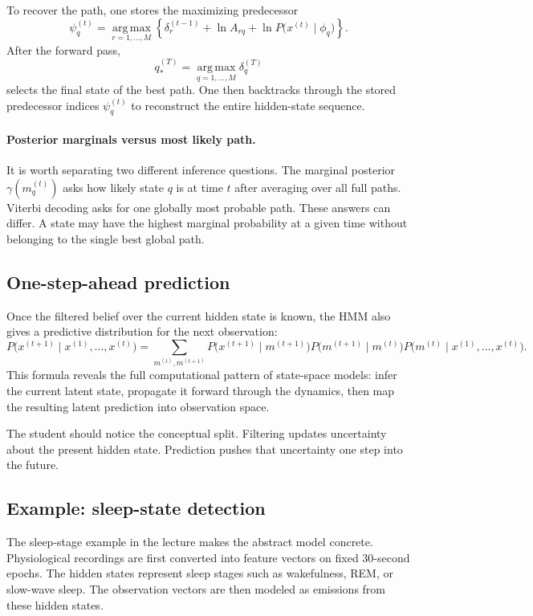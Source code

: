 To recover the path, one stores the maximizing predecessor
\[
  \psi_q^{(t)}
  =
  \operatorname*{arg\,max}_{r=1,\dots,M}
  \left\{
    \delta_r^{(t-1)} + \ln A_{rq} + \ln P\bigl(x^{(t)}\mid \phi_q\bigr)
  \right\}.
\]
After the forward pass,
\[
  q_*^{(T)}
  =
  \operatorname*{arg\,max}_{q=1,\dots,M}\delta_q^{(T)}
\]
selects the final state of the best path. One then backtracks through the stored predecessor indices $\psi_q^{(t)}$ to reconstruct the entire hidden-state sequence.

\paragraph{Posterior marginals versus most likely path.}
It is worth separating two different inference questions. The marginal posterior $\gamma(m_q^{(t)})$ asks how likely state $q$ is at time $t$ after averaging over all full paths. Viterbi decoding asks for one globally most probable path. These answers can differ. A state may have the highest marginal probability at a given time without belonging to the single best global path.

\subsection{One-step-ahead prediction}

Once the filtered belief over the current hidden state is known, the HMM also gives a predictive distribution for the next observation:
\[
  P\bigl(x^{(t+1)}\mid x^{(1)},\dots,x^{(t)}\bigr)
  =
  \sum_{m^{(t)},m^{(t+1)}}
  P\bigl(x^{(t+1)}\mid m^{(t+1)}\bigr)
  P\bigl(m^{(t+1)}\mid m^{(t)}\bigr)
  P\bigl(m^{(t)}\mid x^{(1)},\dots,x^{(t)}\bigr).
\]
This formula reveals the full computational pattern of state-space models: infer the current latent state, propagate it forward through the dynamics, then map the resulting latent prediction into observation space.

The student should notice the conceptual split. Filtering updates uncertainty about the present hidden state. Prediction pushes that uncertainty one step into the future.

\subsection{Example: sleep-state detection}

The sleep-stage example in the lecture makes the abstract model concrete. Physiological recordings are first converted into feature vectors on fixed $30$-second epochs. The hidden states represent sleep stages such as wakefulness, REM, or slow-wave sleep. The observation vectors are then modeled as emissions from these hidden states.

